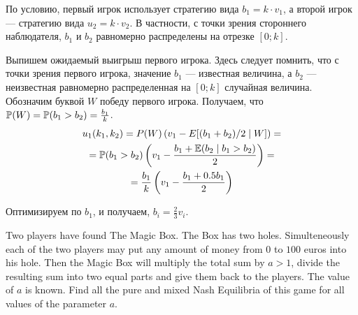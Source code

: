 \begin{solution}
По условию, первый игрок использует стратегию вида $b_1=k\cdot v_1$, а второй игрок --- стратегию вида $u_2=k\cdot v_2$. В частности, с точки зрения стороннего наблюдателя, $b_1$ и $b_2$ равномерно распределены на отрезке $[0;k]$.

Выпишем ожидаемый выигрыш первого игрока. Здесь следует помнить, что с точки зрения первого игрока, значение $b_1$ --- известная величина, а $b_2$ --- неизвестная равномерно распределенная на $[0;k]$ случайная величина. Обозначим буквой $W$ победу первого игрока. Получаем, что $\P(W)=\P(b_1>b_2)=\frac{b_1}{k}$.
\begin{multline}
u_1(k_1,k_2)=P(W) \left( v_1 - E[(b_1+b_2)/2 \mid W] \right)=\\
=\P(b_1>b_2)\left(v_1- \frac{b_1+\E(b_2\mid b_1>b_2)}{2} \right) =\\
= \frac{b_1}{k} \left( v_1 - \frac{b_1+0.5b_1}{2}\right)
\end{multline}

Оптимизируем по $b_1$, и получаем,  $b_i=\frac{2}{3}v_i$.

\end{solution}

\begin{problem}
Two players have found The Magic Box. The Box has two holes. Simulteneously each of the two players may put any amount of money from $0$ to $100$ euros into his hole. Then the Magic Box will multiply the total sum by $a>1$, divide the resulting sum into two equal parts and give them back to the players. The value of $a$ is known. Find all the pure and mixed Nash Equilibria of this game for all values of the parameter $a$.
\end{problem}

